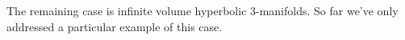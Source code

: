 \documentclass[12pt]{amsart}
\theoremstyle{definition}
\begin{document}
The remaining case is infinite volume hyperbolic 3-manifolds. So far we've only
addressed a particular example of this case.


%
%
%
%
%
%
%
%
%
%
\end{document}
